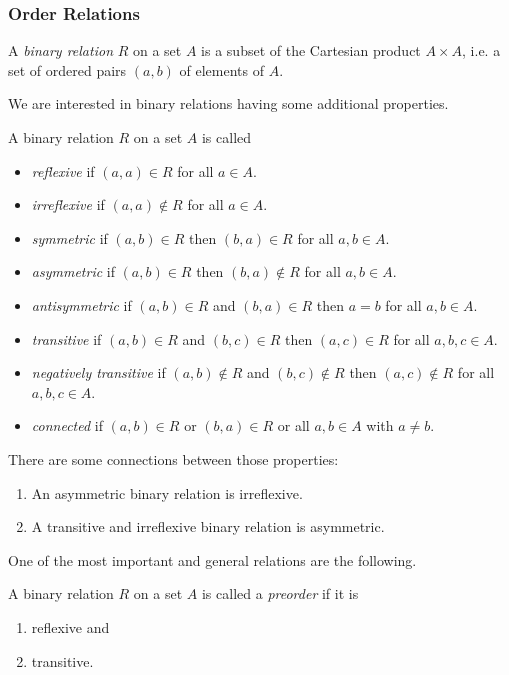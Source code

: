 ﻿\documentclass[a4paper,11pt,final]{article}
\numberwithin{equation}{subsection}
\begin{document}
\subsubsection{Order Relations}
\begin{defi}
A \emph{binary relation} $R$ on a set $A$ is a subset of the Cartesian product $A\times A$, i.e. a set of ordered pairs $(a,b)$ of elements of $A$.
\end{defi}

We are interested in binary relations having some additional properties.
\begin{defi}
A binary relation $R$ on a set $A$ is called
\begin{itemize}
\item \emph{reflexive} if $(a,a)\in R$ for all $a\in A$.
\item \emph{irreflexive} if $(a,a)\notin R$ for all $a\in A$.
\item \emph{symmetric} if $(a,b)\in R$ then $(b,a)\in R$ for all $a,b\in A$.
\item \emph{asymmetric} if $(a,b)\in R$ then $(b,a)\notin R$ for all $a,b\in A$.
\item \emph{antisymmetric} if $(a,b)\in R$ and $(b,a)\in R$ then $a=b$ for all $a,b\in A$.
\item \emph{transitive} if $(a,b)\in R$ and $(b,c)\in R$ then $(a,c)\in R$ for all $a,b,c\in A$.
\item \emph{negatively transitive} if $(a,b)\notin R$ and $(b,c)\notin R$ then $(a,c)\notin R$ for all $a,b,c\in A$.
\item \emph{connected} if $(a,b)\in R$ or $(b,a)\in R$ or all $a,b\in A$ with $a\neq b$.
\end{itemize}
\end{defi}

There are some connections between those properties:
\begin{lem}
\begin{enumerate}
\item An asymmetric binary relation is irreflexive.
\item A transitive and irreflexive binary relation is asymmetric.
\end{enumerate}
\end{lem}

One of the most important and general relations are the following.
\begin{defi}[Preorder]
A binary relation $R$ on a set $A$ is called a \emph{preorder} if it is
\begin{enumerate}
\item reflexive and
\item transitive.
\end{enumerate}
\end{defi}
\end{document}
